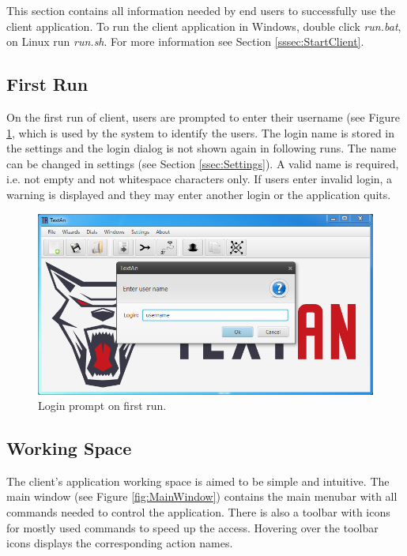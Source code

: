 This section contains all information needed by end users to successfully use
the \textan{} client application. To run the client application in Windows, double click \emph{run.bat}, on Linux run \emph{run.sh}. For more information
see Section \ref{sssec:StartClient}.

\subsection{First Run}

On the first run of \textan{} client, users are prompted to enter their username
(see Figure \ref{fig:Login}, which is used by the system to identify the users.
The login name is stored in the settings and the login dialog is not shown again
in following runs. The name can be changed in settings (see Section
\ref{ssec:Settings}). A valid name is required, i.e. not empty and not
whitespace characters only. If users enter invalid login, a warning is displayed
and they may enter another login or the application quits.

\begin{figure}[!htb]
        \centering
        \includegraphics[width=\textwidth]{Images/login}
        \caption{Login prompt on first run.}
        \label{fig:Login}
\end{figure}

\subsection{Working Space}

The \textan{} client's application working space is aimed to be simple and
intuitive. The main window (see Figure \ref{fig:MainWindow}) contains the main
menubar with all commands needed to control the application. There is also a
toolbar with icons for mostly used commands to speed up the access. Hovering
over the toolbar icons displays the corresponding action names.

